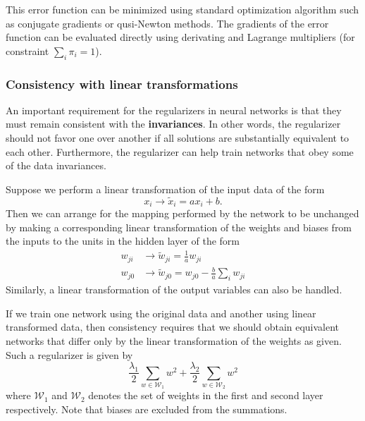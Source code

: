 \documentclass[a4paper]{book}
\renewcommand{\cal}{\mathcal}
\begin{document}
This error function can be minimized using standard optimization algorithm such as conjugate gradients or qusi-Newton methods. The gradients of the error function can be evaluated directly using derivating and Lagrange multipliers (for constraint $\sum_i \pi_i = 1$).

\subsubsection{Consistency with linear transformations}
An important requirement for the regularizers in neural networks is that they must remain consistent with the \textbf{invariances}. In other words, the regularizer should not favor one over another if all solutions are substantially equivalent to each other. Furthermore, the regularizer can help train networks that obey some of the data invariances.

Suppose we perform a linear transformation of the input data of the form
\begin{equation}
	x_i \rightarrow \tilde{x}_i = ax_i+b.
\end{equation}
Then we can arrange for the mapping performed by the network to be unchanged by making a corresponding linear transformation of the weights and biases from the inputs to the units in the hidden layer of the form
\begin{align}
	w_{ji} &\rightarrow \tilde{w}_{ji} = \frac{1}{a}w_{ji} \\
	w_{j0} &\rightarrow \tilde{w}_{j0} = w_{j0} - \frac{b}{a} \sum_i w_{ji}
\end{align}
Similarly, a linear transformation of the output variables can also be handled.

If we train one network using the original data and another using linear transformed data, then consistency requires that we should obtain equivalent networks that differ only by the linear transformation of the weights as given. Such a regularizer is given by
\begin{equation}
	\frac{\lambda_1}{2} \sum_{w \in \cal{W}_1} w^2 + \frac{\lambda_2}{2} \sum_{w \in \cal{W}_2} w^2
\end{equation}
where $\cal{W}_1$ and $\cal{W}_2$ denotes the set of weights in the first and second layer respectively. Note that biases are excluded from the summations.
\end{document}
